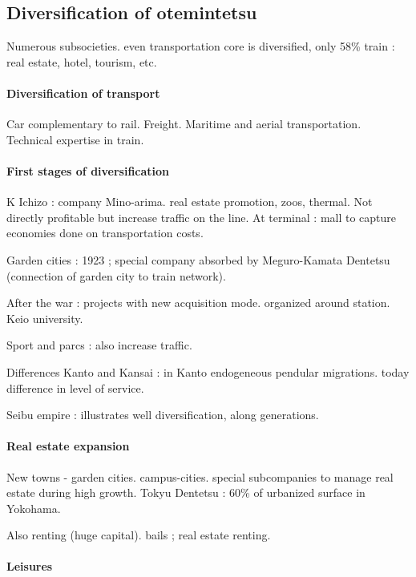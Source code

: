 \subsection{Diversification of otemintetsu}

Numerous subsocieties. even transportation core is diversified, only 58\% train : real estate, hotel, tourism, etc.

\paragraph{Diversification of transport}

Car complementary to rail. Freight. Maritime and aerial transportation. Technical expertise in train.

\paragraph{First stages of diversification}

K Ichizo : company Mino-arima. real estate promotion, zoos, thermal. Not directly profitable but increase traffic on the line. At terminal : mall to capture economies done on transportation costs. 

Garden cities : 1923 ; special company absorbed by Meguro-Kamata Dentetsu (connection of garden city to train network).

After the war : projects with new acquisition mode. organized around station. Keio university.

Sport and parcs : also increase traffic.

Differences Kanto and Kansai : in Kanto endogeneous pendular migrations. today difference in level of service.

Seibu empire : illustrates well diversification, along generations.

\paragraph{Real estate expansion}

New towns - garden cities. campus-cities. special subcompanies to manage real estate during high growth. Tokyu Dentetsu : 60\% of urbanized surface in Yokohama.

Also renting (huge capital). bails ; real estate renting.

\paragraph{Leisures}

